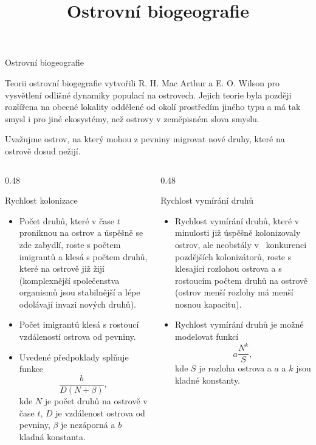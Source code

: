 \documentclass[handouts]{beamer}
\title{Ostrovní biogeografie}
\begin{document}
\begin{frame}

  \begin{center}
    \Large Ostrovní biogeografie
  \end{center}
  
  Teorii ostrovní biogegrafie vytvořili R. H. Mac Arthur a
  E. O. Wilson pro vysvětlení odlišné dynamiky populací na
  ostrovech. Jejich teorie byla později rozšířena na obecné lokality
  oddělené od okolí prostředím jiného typu a má tak smysl i pro jiné ekosystémy, než ostrovy v zeměpisném slova smyslu.

  \medskip
  Uvažujme ostrov, na který mohou z pevniny migrovat nové druhy, které
  na ostrově dosud nežijí.


  \begin{columns}
    \begin{column}[t]{0.48\hsize}
      \begin{block}{Rychlost kolonizace}
\begin{itemize}
\item Počet druhů, které v čase
$t$ proniknou na ostrov a úspěšně se zde zabydlí, roste s počtem
imigrantů  a klesá s počtem druhů, které na ostrově  již žijí (komplexnější společenstva organismů jsou stabilnější a lépe
odolávají invazi nových druhů).
\item  Počet imigrantů klesá s rostoucí
vzdáleností ostrova od pevniny.
\item  Uvedené předpoklady splňuje funkce
$$
 \frac b{D(N+\beta)},
$$
kde $N$ je počet druhů na ostrově v čase $t$, $D$ je vzdálenost ostrova od
pevniny, $\beta$ je nezáporná a  $b$ kladná konstanta. 
\end{itemize}
\end{block}
\end{column}
\begin{column}[t]{0.48\hsize}
  \begin{block}{Rychlost vymírání  druhů}

\begin{itemize}
\item Rychlost vymírání  druhů, které v minulosti již úspěšně
kolonizovaly ostrov, ale neobstály v~ konkurenci pozdějších kolonizátorů,
roste s~ klesající rozlohou ostrova a s rostoucím počtem druhů na
ostrově (ostrov menší rozlohy má menší nosnou
kapacitu).
\item Rychlost vymírání druhů je možné modelovat funkcí
$$
 a\frac {N^k}S,
$$
kde $S$ je rozloha ostrova a $a$ a $k$ jsou kladné konstanty.
\end{itemize}
\end{block}
\end{column}
\end{columns}


\end{frame}
\end{document}
